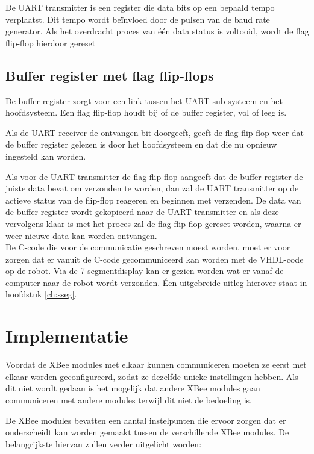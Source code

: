 \documentclass{report}
\begin{document}
 De UART transmitter is een register die data bits op een bepaald tempo verplaatst.
Dit tempo wordt beïnvloed door de pulsen van de baud rate generator.
Als het overdracht proces van één data status is voltooid, wordt de flag flip-flop hierdoor gereset
 
\subsection*{Buffer register met flag flip-flops}

 De buffer register zorgt voor een link tussen het UART sub-systeem en het hoofdsysteem.
Een flag flip-flop houdt bij of de buffer register, vol of leeg is.

Als de UART receiver de ontvangen bit doorgeeft, geeft de flag flip-flop weer dat de buffer register gelezen is door het hoofdsysteem en dat die nu opnieuw ingesteld kan worden.

Als voor de UART transmitter de flag flip-flop aangeeft dat de buffer register de juiste data bevat om verzonden te worden, dan zal de UART transmitter op de actieve status van de flip-flop reageren en beginnen met verzenden.
De data van de buffer register wordt gekopieerd naar de UART transmitter en als deze vervolgens klaar is met het proces zal de flag flip-flop gereset worden, waarna er weer nieuwe data kan worden ontvangen.
\\

De C-code die voor de communicatie geschreven moest worden, moet er voor zorgen dat er vanuit de C-code gecommuniceerd kan worden met de VHDL-code op de robot.
Via de 7-segmentdisplay kan er gezien worden wat er vanaf de computer naar de robot wordt verzonden. Éen uitgebreide uitleg hierover staat in hoofdstuk \ref{ch:sseg}.


\section{Implementatie}
Voordat de XBee modules met elkaar kunnen communiceren moeten ze eerst met elkaar worden geconfigureerd, zodat ze dezelfde unieke instellingen hebben.
Als dit niet wordt gedaan is het mogelijk dat andere XBee modules gaan communiceren met andere modules terwijl dit niet de bedoeling is.

De XBee modules bevatten een aantal instelpunten die ervoor zorgen dat er onderscheidt kan worden gemaakt tussen de verschillende XBee modules.
De belangrijkste hiervan zullen verder uitgelicht worden:
\end{document}
